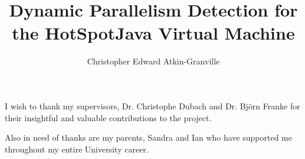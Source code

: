 \documentclass[msc,cs,parskip,leftchapter,logo,twoside,abbrevs,11pt]{infthesis}
\title{Dynamic Parallelism Detection for the HotSpot\texttrademark Java Virtual Machine}
\author{Christopher Edward Atkin-Granville}
\begin{document}
	\begin{preliminary}
		\maketitle
		\begin{acknowledgements}
		I wish to thank my supervisors, Dr. Christophe Dubach and Dr. Bj\"{o}rn Franke for their insightful and valuable contributions to the project.

		Also in need of thanks are my parents, Sandra and Ian who have supported me throughout my entire University career.
		\end{acknowledgements}
		\standarddeclaration
		\dedication{To my grandfather, Leslie.}
		\tableofcontents
		\listoffigures
		\listofalgorithms
	\end{preliminary}

	
	
	
	
	
	
	
	
	
	

	
	
\end{document}
